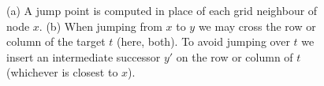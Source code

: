 \begin{figure}[tb]
       \begin{center}
         \scalebox{.8}{}
       \end{center}
       \caption{\small (a) A jump point is computed in place of each grid neighbour of node $x$.
		(b) When jumping from $x$ to $y$ we may cross the row or column of the target $t$ (here, both). 
To avoid jumping over $t$ we insert an intermediate successor $y'$ on the row or column of $t$ (whichever is closest to $x$).}
       \label{fig:preproc}
\end{figure}
